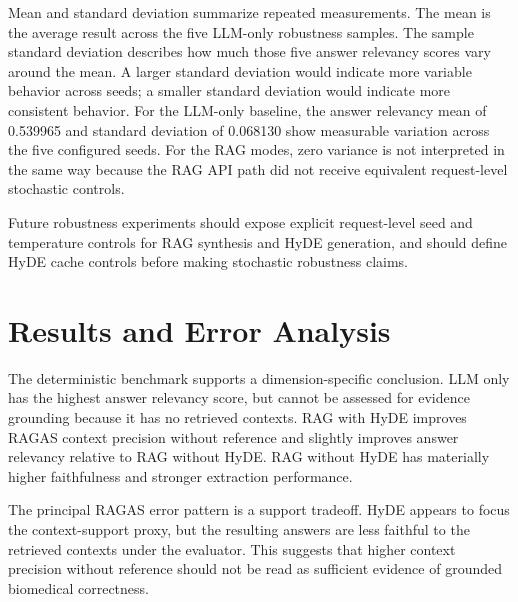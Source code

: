 Mean and standard deviation summarize repeated measurements. The mean is the average result across the five LLM-only robustness samples. The sample standard deviation describes how much those five answer relevancy scores vary around the mean. A larger standard deviation would indicate more variable behavior across seeds; a smaller standard deviation would indicate more consistent behavior. For the LLM-only baseline, the answer relevancy mean of 0.539965 and standard deviation of 0.068130 show measurable variation across the five configured seeds. For the RAG modes, zero variance is not interpreted in the same way because the RAG API path did not receive equivalent request-level stochastic controls.

Future robustness experiments should expose explicit request-level seed and temperature controls for RAG synthesis and HyDE generation, and should define HyDE cache controls before making stochastic robustness claims.

\section{Results and Error Analysis}

The deterministic benchmark supports a dimension-specific conclusion. LLM only has the highest answer relevancy score, but cannot be assessed for evidence grounding because it has no retrieved contexts. RAG with HyDE improves RAGAS context precision without reference and slightly improves answer relevancy relative to RAG without HyDE. RAG without HyDE has materially higher faithfulness and stronger extraction performance.

The principal RAGAS error pattern is a support tradeoff. HyDE appears to focus the context-support proxy, but the resulting answers are less faithful to the retrieved contexts under the evaluator. This suggests that higher context precision without reference should not be read as sufficient evidence of grounded biomedical correctness.


